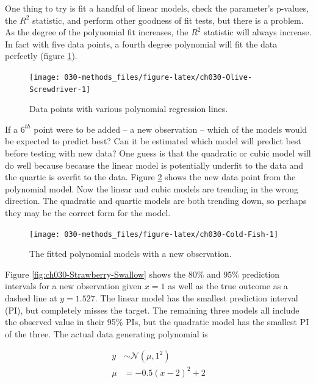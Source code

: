 \documentclass[11pt, oneside, openany]{scrbook}
\begin{document}
One thing to try is fit a handful of linear models, check the parameter's p-values, the \(R^2\) statistic, and perform other goodness of fit tests, but there is a problem. As the degree of the polynomial fit increases, the \(R^2\) statistic will always increase. In fact with five data points, a fourth degree polynomial will fit the data perfectly (figure \ref{fig:ch030-Olive-Screwdriver}).

\begin{figure}

{\centering \texttt{[image: 030-methods\_files/figure-latex/ch030-Olive-Screwdriver-1]} 

}

\caption{Data points with various polynomial regression lines.}\label{fig:ch030-Olive-Screwdriver}
\end{figure}

If a \(6^{th}\) point were to be added -- a new observation -- which of the models would be expected to predict best? Can it be estimated which model will predict best before testing with new data? One guess is that the quadratic or cubic model will do well because because the linear model is potentially underfit to the data and the quartic is overfit to the data. Figure \ref{fig:ch030-Cold-Fish} shows the new data point from the polynomial model. Now the linear and cubic models are trending in the wrong direction. The quadratic and quartic models are both trending down, so perhaps they may be the correct form for the model.

\begin{figure}

{\centering \texttt{[image: 030-methods\_files/figure-latex/ch030-Cold-Fish-1]} 

}

\caption{The fitted polynomial models with a new observation.}\label{fig:ch030-Cold-Fish}
\end{figure}

Figure \ref{fig:ch030-Strawberry-Swallow} shows the 80\% and 95\% prediction intervals for a new observation given \(x = 1\) as well as the true outcome as a dashed line at \(y = 1.527\). The linear model has the smallest prediction interval (PI), but completely misses the target. The remaining three models all include the observed value in their 95\% PIs, but the quadratic model has the smallest PI of the three. The actual data generating polynomial is


\begin{align*}
y &\sim \mathcal{N}(\mu, 1^2) \\
\mu &= -0.5(x - 2)^2 + 2
\end{align*}
\end{document}
